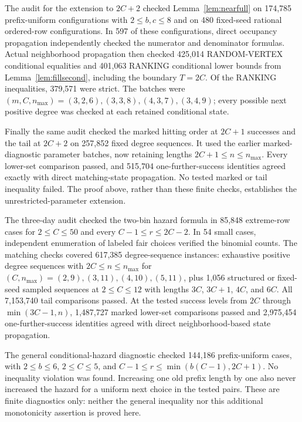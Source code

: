 \documentclass[11pt]{article}
\begin{document}
The audit for the extension to $2C+2$ checked
Lemma~\ref{lem:nearfull} on 174,785 prefix-uniform configurations
with $2\leq b,c\leq8$ and on 480 fixed-seed rational ordered-row
configurations. In 597 of these configurations, direct occupancy
propagation independently checked the numerator and denominator formulas.
Actual neighborhood propagation then checked 425,014 RANDOM-VERTEX
conditional equalities and 401,063 RANKING conditional lower bounds
from Lemma~\ref{lem:fillsecond}, including the boundary $T=2C$.
Of the RANKING inequalities, 379,571 were strict. The batches were
$(m,C,n_{\max})=(3,2,6),(3,3,8),(4,3,7),(3,4,9)$; every possible
next positive degree was checked at each retained conditional state.

Finally the same audit checked the marked hitting order at $2C+1$
successes and the tail at $2C+2$ on 257,852 fixed degree sequences.
It used the earlier marked-diagnostic parameter batches, now retaining
lengths $2C+1\leq n\leq n_{\max}$. Every lower-set comparison passed,
and 515,704 one-further-success identities agreed exactly with direct
matching-state propagation. No tested marked or tail inequality failed.
The proof above, rather than these finite checks, establishes the
unrestricted-parameter extension.

The three-day audit checked the two-bin hazard formula in 85,848
extreme-row cases for $2\leq C\leq50$ and every
$C-1\leq r\leq2C-2$. In 54 small cases, independent enumeration
of labeled fair choices verified the binomial counts. The matching
checks covered 617,385 degree-sequence instances: exhaustive positive
degree sequences with $2C\leq n\leq n_{\max}$ for
$(C,n_{\max})=(2,9),(3,11),(4,10),(5,11)$, plus 1,056 structured
or fixed-seed sampled sequences at $2\leq C\leq12$ with lengths
$3C$, $3C+1$, $4C$, and $6C$.
All 7,153,740 tail comparisons passed. At the tested success levels
from $2C$ through $\min(3C-1,n)$, 1,487,727 marked lower-set
comparisons passed and 2,975,454 one-further-success identities agreed
with direct neighborhood-based state propagation.

The general conditional-hazard diagnostic checked 144,186
prefix-uniform cases, with $2\leq b\leq6$, $2\leq C\leq5$, and
$C-1\leq r\leq\min(b(C-1),2C+1)$. No inequality violation was
found. Increasing one old prefix length by one also never increased
the hazard for a uniform next choice in the tested pairs. These are
finite diagnostics only: neither the general inequality nor this
additional monotonicity assertion is proved here.
\end{document}
